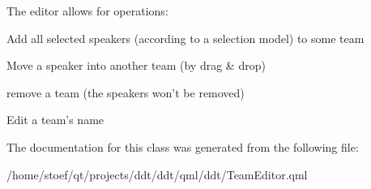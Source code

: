The editor allows for operations\-:
\begin{DoxyItemize}
\item Add all selected speakers (according to a selection model) to some team
\item Move a speaker into another team (by drag \& drop)
\item remove a team (the speakers won't be removed)
\item Edit a team's name 
\end{DoxyItemize}

The documentation for this class was generated from the following file\-:\begin{DoxyCompactItemize}
\item 
/home/stoef/qt/projects/ddt/ddt/qml/ddt/Team\-Editor.\-qml\end{DoxyCompactItemize}
